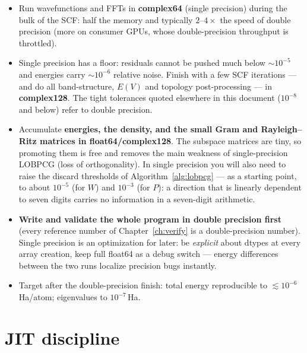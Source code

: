 \begin{itemize}[leftmargin=2em]
\item Run wavefunctions and FFTs in \textbf{complex64} (single precision)
during the bulk of the SCF: half the memory and typically $2$--$4\times$
the speed of double precision (more on consumer GPUs, whose double-precision
throughput is throttled).
\item Single precision has a floor: residuals cannot be pushed much below
$\sim10^{-5}$ and energies carry $\sim10^{-6}$ relative noise. Finish with
a few SCF iterations --- and do all band-structure, $E(V)$ and topology
post-processing --- in \textbf{complex128}. The tight tolerances quoted
elsewhere in this document ($10^{-8}$ and below) refer to double
precision.
\item Accumulate \textbf{energies, the density, and the small Gram and
Rayleigh--Ritz matrices in float64/complex128}. The subspace matrices are
tiny, so promoting them is free and removes the main weakness of
single-precision LOBPCG (loss of orthogonality). In single precision you
will also need to raise the discard thresholds of
Algorithm~\ref{alg:lobpcg} --- as a starting point, to about
$10^{-5}$ (for $W$) and $10^{-3}$ (for $P$): a direction that is linearly
dependent to seven digits carries no information in a seven-digit
arithmetic.
\item \textbf{Write and validate the whole program in double precision
first} (every reference number of Chapter~\ref{ch:verify} is a
double-precision number). Single precision is an optimization for later:
be \emph{explicit} about dtypes at every array creation, keep full
float64 as a debug switch --- energy differences between the two runs
localize precision bugs instantly.
\item Target after the double-precision finish: total energy reproducible
to $\lesssim 10^{-6}$\,Ha/atom; eigenvalues to $10^{-7}$\,Ha.
\end{itemize}

\section{JIT discipline}

